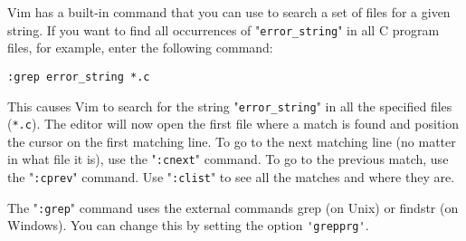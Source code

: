 Vim has a built-in command that you can use to search a set of files for a given string.
If you want to find all occurrences of "\verb!error_string!" in all C program files, for example, enter the following command:

\begin{Verbatim}[samepage=true]
 :grep error_string *.c
\end{Verbatim}

This causes Vim to search for the string "\verb!error_string!" in all the specified files (\verb!*.c!).
The editor will now open the first file where a match is found and position the cursor on the first matching line.
To go to the next matching line (no matter in what file it is), use the "\verb!:cnext!" command.
To go to the previous match, use the "\verb!:cprev!" command.
Use "\verb!:clist!" to see all the matches and where they are.

The "\verb!:grep!" command uses the external commands grep (on Unix) or findstr (on Windows).
You can change this by setting the option \verb!'grepprg'!.
\clearpage
